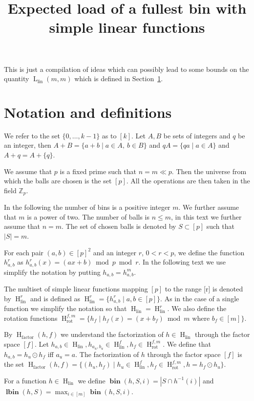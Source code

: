 \documentclass{article}
\title{Expected load of a fullest bin with simple linear functions}
\newcommand{\llinnm}[2]{\operatorname{L}_{\operatorname{lin}}({#1}, {#2})}
\newcommand{\llinn}[1]{\llinnm{#1}{#1}}
\newcommand{\hlinr}[1]{\operatorname{H}_{\operatorname{lin}}^{#1}}
\newcommand{\hlin}{\operatorname{H}_{\operatorname{lin}}}
\newcommand{\hfact}[2]{\operatorname{H}_{\operatorname{factor}}({#1}, {#2})}
\newcommand{\rot}[2]{\operatorname{H}_{\operatorname{rot}}^{{#1}, {#2}}}
\newcommand{\bin}[3]{\operatorname{\mathbf{bin}}({#1}, {#2}, {#3})}
\newcommand{\lbin}[2]{\operatorname{\mathbf{lbin}}({#1}, {#2})}
\begin{document}
\maketitle

This is just a compilation of ideas which can possibly lead to some bounds on the quantity $\llinn{m}$ which is defined in Section~\ref{sec:notation}.

\section{Notation and definitions}
\label{sec:notation}
We refer to the set $\{0, \dots, k - 1\}$ as to $[k]$.
Let $A, B$ be sets of integers and $q$ be an integer, then $A + B = \{a + b \mid a \in A,\ b \in B\}$ and $qA = \{qa \mid a \in A \}$ and $A + q = A + \{q\}$.

We assume that $p$ is a fixed prime such that $n = m \ll p$.
Then the universe from which the balls are chosen is the set $[p]$.
All the operations are then taken in the field $\mathbb{Z}_p$.

In the following the number of bins is a positive integer $m$.
We further assume that $m$ is a power of two.
The number of balls is $n \leq m$, in this text we further assume that $n = m$.
The set of chosen balls is denoted by $S \subset [p]$ such that $|S| = m$.

For each pair $(a, b) \in [p]^2$ and an integer $r$, $0 < r < p$, we define the function $h_{a, b}^r$ as $h_{a, b}^r(x) = (ax + b) \bmod p \bmod r$.
In the following text we use simplify the notation by putting $h_{a, b} = h_{a, b}^m$.

The multiset of simple linear functions mapping $[p]$ to the range [r] is denoted by $\hlinr{r}$ and is defined as $\hlinr{r} = \{h_{a, b}^r \mid a, b \in [p] \}$.
As in the case of a single function we simplify the notation so that $\hlin = \hlinr{r}$.
We also define the rotation functions $\rot{f}{m} = \{h_f \mid h_f(x) = (x + b_f) \bmod m \text{ where } b_f \in [m] \}$.

By $\hfact{h}{f}$ we understand the factorization of $h \in \hlin$ through the factor space $[f]$.
Let $h_{a, b} \in \hlin, h_{a_u, b_u} \in \hlinr{f}, h_f \in \rot{f}{m}$.
We define that $h_{a, b} = h_u \odot h_f$ iff $a_u = a$.
The factorization of $h$ through the factor space $[f]$ is the set $\hfact{h}{f} = \{ (h_u, h_f) \mid h_u \in \hlinr{f}, h_f \in \rot{f}{m}, h = h_f \odot h_u \}.$

For a function $h \in \hlin$ we define $\bin{h}{S}{i} = |S \cap h^{-1}(i)|$ and $\lbin{h}{S} = \max_{i \in [m]} \bin{h}{S}{i}$.
\end{document}
